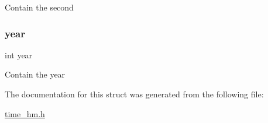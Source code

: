 Contain the second \mbox{\label{structtime__cplt__st_abeac221e38b7b9ce7df8722c842bf671}} 
\subsubsection{\texorpdfstring{year}{year}}
{\footnotesize\ttfamily int year}

Contain the year 

The documentation for this struct was generated from the following file\+:\begin{DoxyCompactItemize}
\item 
\mbox{\hyperlink{time__hm_8h}{time\+\_\+hm.\+h}}\end{DoxyCompactItemize}
